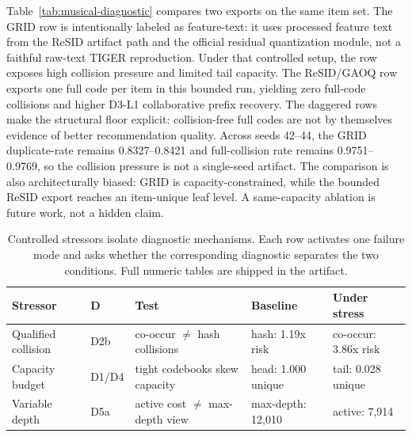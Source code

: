 Table~\ref{tab:musical-diagnostic} compares two exports on the same item set.
The GRID row is intentionally labeled as feature-text: it uses processed
feature text from the ReSID artifact path and the official residual
quantization module, not a faithful raw-text TIGER reproduction. Under that
controlled setup, the row exposes high collision pressure and limited tail
capacity. The ReSID/GAOQ row exports one full code per item in this bounded
run, yielding zero full-code collisions and higher D3-L1 collaborative prefix
recovery. The daggered rows make the structural floor explicit: collision-free
full codes are not by themselves evidence of better recommendation quality.
Across seeds 42--44, the GRID duplicate-\sid rate remains 0.8327--0.8421 and
full-collision rate remains 0.9751--0.9769, so the collision pressure is not a
single-seed artifact. The comparison is also architecturally biased: GRID is
capacity-constrained, while the bounded ReSID export reaches an item-unique
leaf level. A same-capacity ablation is future work, not a hidden claim.

\begin{table}[t]
\caption{Controlled stressors isolate diagnostic mechanisms. Each row activates
one failure mode and asks whether the corresponding diagnostic separates the
two conditions. Full numeric tables are shipped in the artifact.}
\label{tab:controller-stressors}
\scriptsize
\setlength{\tabcolsep}{2pt}
\begin{tabular}{@{}>{\raggedright\arraybackslash}p{}>{\raggedright\arraybackslash}p{}>{\raggedright\arraybackslash}p{}>{\raggedright\arraybackslash}p{}>{\raggedright\arraybackslash}p{}@{}}
\toprule
Stressor & D & Test & Baseline & Under stress \\
\midrule
Qualified collision & D2b & co-occur $\ne$ hash collisions & hash: 1.19x risk & co-occur: 3.86x risk \\
Capacity budget & D1/D4 & tight codebooks skew capacity & head: 1.000 unique & tail: 0.028 unique \\
Variable depth & D5a & active cost $\ne$ max-depth view & max-depth: 12,010 & active: 7,914 \\
\bottomrule
\end{tabular}
\end{table}

